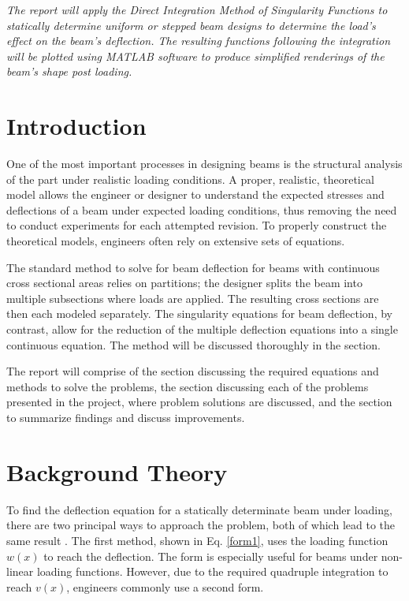 \documentclass[a4paper]{article}
\begin{document}



\large
\textit{The report will apply the Direct Integration Method of Singularity Functions to statically determine uniform or stepped beam designs to determine the load's effect on the beam's deflection. The resulting functions following the integration will be plotted using MATLAB software to produce simplified renderings of the beam's shape post loading.}

\tableofcontents

\section{Introduction} \label{Introduction}
One of the most important processes in designing beams is the structural analysis of the part under realistic loading conditions. A proper, realistic, theoretical model allows the engineer or designer to understand the expected stresses and deflections of a beam under expected loading conditions, thus removing the need to conduct experiments for each attempted revision. To properly construct the theoretical models, engineers often rely on extensive sets of equations.

The standard method to solve for beam deflection for beams with continuous cross sectional areas relies on partitions; the designer splits the beam into multiple subsections where loads are applied. The resulting cross sections are then each modeled separately. The singularity equations for beam deflection, by contrast, allow for the reduction of the multiple deflection equations into a single continuous equation. The method will be discussed thoroughly in the  section.

The report will comprise of the  section discussing the required equations and methods to solve the problems, the  section discussing each of the problems presented in the project,  where problem solutions are discussed, and the  section to summarize findings and discuss improvements.

\section{Background Theory} \label{Background Theory}
To find the deflection equation for a statically determinate beam under loading, there are two principal ways to approach the problem, both of which lead to the same result \cite{book}. The first method, shown in Eq. \ref{form1}, uses the loading function $w(x)$ to reach the deflection. The form is especially useful for beams under non-linear loading functions. However, due to the required quadruple integration to reach $v(x)$, engineers commonly use a second form.
\end{document}
